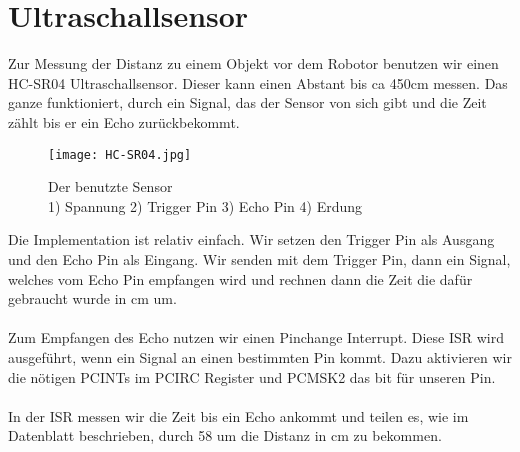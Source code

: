 \documentclass[12pt]{article}
\begin{document}
\section{Ultraschallsensor} %
Zur Messung der Distanz zu einem Objekt vor dem Robotor benutzen wir einen HC-SR04 Ultraschallsensor. Dieser kann einen Abstant bis ca 450cm messen. Das ganze funktioniert, durch ein Signal, das der Sensor von sich gibt und die Zeit zählt bis er ein Echo zurückbekommt.\\
\begin{figure}[h]
	\texttt{[image: HC-SR04.jpg]}
	\centering
	\caption{Der benutzte Sensor \\1) Spannung 2) Trigger Pin 3) Echo Pin 4) Erdung}
\end{figure} 
Die Implementation ist relativ einfach. Wir setzen den Trigger Pin als Ausgang und den Echo Pin als Eingang. Wir senden mit dem Trigger Pin, dann ein Signal, welches vom Echo Pin empfangen wird und rechnen dann die Zeit die dafür gebraucht wurde in cm um.\\
\\
Zum Empfangen des Echo nutzen wir einen Pinchange Interrupt. Diese ISR wird ausgeführt, wenn ein Signal an einen bestimmten Pin kommt. Dazu aktivieren wir die nötigen PCINTs im PCIRC Register und PCMSK2 das bit für unseren Pin.\\
\\
In der ISR messen wir die Zeit bis ein Echo ankommt und teilen es, wie im Datenblatt beschrieben, durch 58 um die Distanz in cm zu bekommen.
\end{document}
